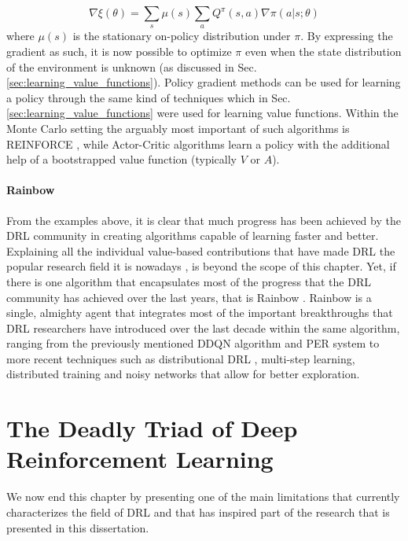 \begin{equation}
	\nabla \xi(\theta) = \sum_{s} \mu(s) \sum_{a} Q^{\pi}(s,a) \nabla \pi(a|s;\theta)
\end{equation}
where $\mu(s)$ is the stationary on-policy distribution under $\pi$. By expressing the gradient as such, it is now possible to optimize $\pi$ even when the state distribution of the environment is unknown (as discussed in Sec. \ref{sec:learning_value_functions}). Policy gradient methods can be used for learning a policy through the same kind of techniques which in Sec. \ref{sec:learning_value_functions} were used for learning value functions. Within the Monte Carlo setting the arguably most important of such algorithms is REINFORCE \cite{williams1992simple}, while Actor-Critic algorithms \cite{lillicrap2015continuous,schulman2015high,schulman2015trust,wang2016sample,mnih2016asynchronous,schulman2017proximal,haarnoja2018soft,fujimoto2018addressing} learn a policy with the additional help of a bootstrapped value function (typically $V$ or $A$).


\paragraph{\textbf{\uppercase{R}ainbow}} From the examples above, it is clear that much progress has been achieved by the DRL community in creating algorithms capable of learning faster and better. Explaining all the individual value-based contributions that have made DRL the popular research field it is nowadays \cite{henderson2018deep}, is beyond the scope of this chapter. Yet, if there is one algorithm that encapsulates most of the progress that the DRL community has achieved over the last years, that is Rainbow \cite{hessel2018rainbow}. Rainbow is a single, almighty agent that integrates most of the important breakthroughs that DRL researchers have introduced over the last decade within the same algorithm, ranging from the previously mentioned DDQN algorithm and PER system to more recent techniques such as distributional DRL \cite{bellemare2017distributional}, multi-step learning, distributed training \cite{mnih2016asynchronous} and noisy networks \cite{fortunato2017noisy} that allow for better exploration.


\section{The Deadly Triad of Deep Reinforcement Learning}
\label{sec:challenges}
We now end this chapter by presenting one of the main limitations that currently characterizes the field of DRL and that has inspired part of the research that is presented in this dissertation.


